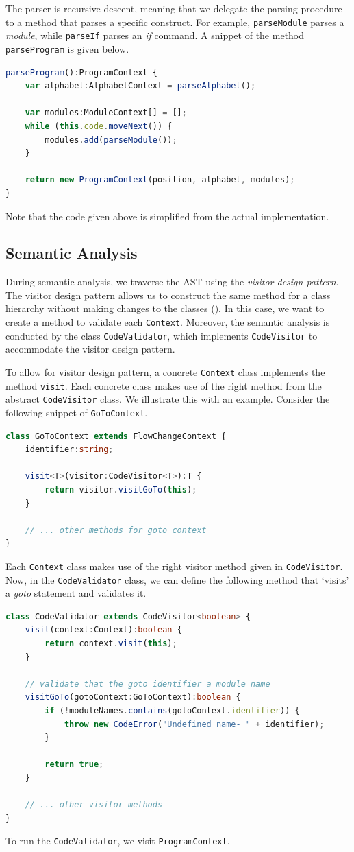 The parser is recursive-descent, meaning that we delegate the parsing procedure to a method that parses a specific construct. For example, \texttt{parseModule} parses a \textit{module}, while \texttt{parseIf} parses an \textit{if} command. A snippet of the method \texttt{parseProgram} is given below.
\begin{lstlisting}[language=TypeScript]
parseProgram():ProgramContext {
    var alphabet:AlphabetContext = parseAlphabet();
    
    var modules:ModuleContext[] = [];
    while (this.code.moveNext()) {
        modules.add(parseModule());
    }
    
    return new ProgramContext(position, alphabet, modules);
}
\end{lstlisting}
Note that the code given above is simplified from the actual implementation.

\subsection{Semantic Analysis}
During semantic analysis, we traverse the AST using the \emph{visitor design pattern}. The visitor design pattern allows us to construct the same method for a class hierarchy without making changes to the classes (\cite{gamma1995design}). In this case, we want to create a method to validate each \texttt{Context}. Moreover, the semantic analysis is conducted by the class \texttt{CodeValidator}, which implements \texttt{CodeVisitor} to accommodate the visitor design pattern.

To allow for visitor design pattern, a concrete \texttt{Context} class implements the method \texttt{visit}. Each concrete class makes use of the right method from the abstract \texttt{CodeVisitor} class. We illustrate this with an example. Consider the following snippet of \texttt{GoToContext}.
\begin{lstlisting}[language=TypeScript]
class GoToContext extends FlowChangeContext {    
    identifier:string;
    
    visit<T>(visitor:CodeVisitor<T>):T {
        return visitor.visitGoTo(this);
    }

    // ... other methods for goto context
}
\end{lstlisting}
    Each \texttt{Context} class makes use of the right visitor method given in \texttt{CodeVisitor}. Now, in the \texttt{CodeValidator} class, we can define the following method that `visits' a \textit{goto} statement and validates it.
\begin{lstlisting}[language=TypeScript]
class CodeValidator extends CodeVisitor<boolean> {
    visit(context:Context):boolean {
        return context.visit(this);
    }
    
    // validate that the goto identifier a module name
    visitGoTo(gotoContext:GoToContext):boolean {
        if (!moduleNames.contains(gotoContext.identifier)) {
            throw new CodeError("Undefined name- " + identifier);
        }

        return true;
    }

    // ... other visitor methods
}
\end{lstlisting}
To run the \texttt{CodeValidator}, we visit \texttt{ProgramContext}.

